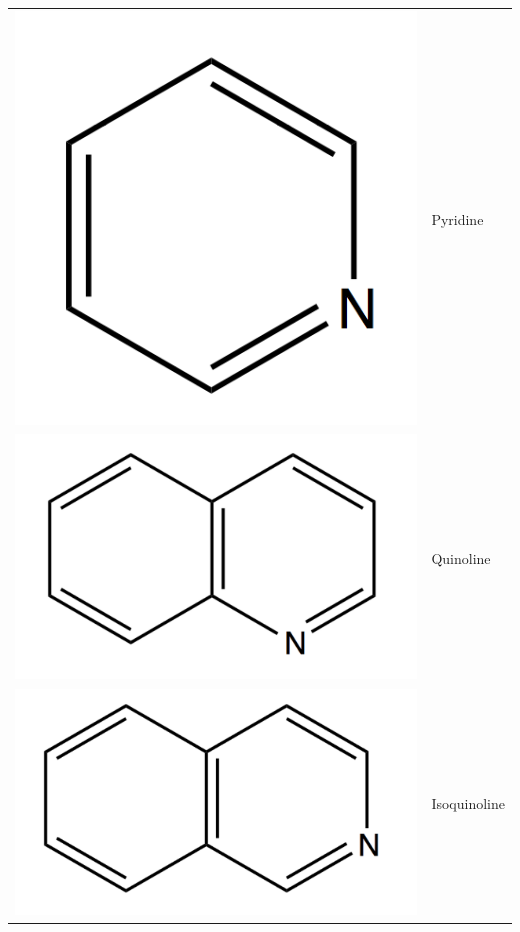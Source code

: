 \documentclass[12pt,a4paper]{book}
\begin{document}
\begin{table}[h!]
	\begin{center}
		\begin{tabular}{rl}
			\hline
			\includegraphics[scale=0.08]{../image/pyridine} & Pyridine \\
			\includegraphics[scale=0.08]{../image/quinoline} & Quinoline \\
			\includegraphics[scale=0.08]{../image/isoquinoline} & Isoquinoline \\

\end{tabular}
\end{center}
\end{table}
\end{document}
